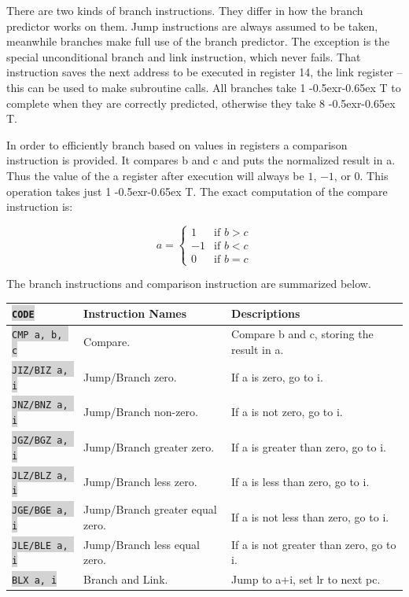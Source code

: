 \documentclass{article}
\newcommand{\vnscode}[1]{\colorbox{lightgray}{\lstinline[language=vns]{#1}}}
\newcommand{\RT}{\lower-0.5ex\hbox{r}\kern-0.65ex T}
\begin{document}
There are two kinds of branch instructions. They differ in how the branch
predictor works on them. Jump instructions are always assumed to be taken,
meanwhile branches make full use of the branch predictor. The exception is the
special unconditional branch and link instruction, which never fails. That
instruction saves the next address to be executed in register 14, the link
register -- this can be used to make subroutine calls. All branches take 1 \RT
to complete when they are correctly predicted, otherwise they take 8 \RT.

In order to efficiently branch based on values in registers a comparison
instruction is provided. It compares b and c and puts the normalized result in
a. Thus the value of the a register after execution will always be $1$, $-1$, or
$0$. This operation takes just 1 \RT. The exact computation of the compare
instruction is:

\begin{displaymath}
    a = \begin{cases}
        1 & \mbox{if } b > c \\
        -1 & \mbox{if } b < c \\
        0 & \mbox{if } b = c \end{cases}
\end{displaymath}

The branch instructions and comparison instruction are summarized below.

\begin{minipage}{\textwidth}
\label{table:branch}
\centering
\begin{tabular}{lll}
    \hline \vnscode{CODE} & Instruction Names & Descriptions \\ \hline
    \vnscode{CMP a, b, c} & Compare. & Compare b and c, storing the result in a. \\
    \vnscode{JIZ/BIZ a, i} & Jump/Branch zero. & If a is zero, go to i. \\
    \vnscode{JNZ/BNZ a, i} & Jump/Branch non-zero. & If a is not zero, go to i. \\
    \vnscode{JGZ/BGZ a, i} & Jump/Branch greater zero. & If a is greater than zero, go to i. \\
    \vnscode{JLZ/BLZ a, i} & Jump/Branch less zero. & If a is less than zero, go to i. \\
    \vnscode{JGE/BGE a, i} & Jump/Branch greater equal zero. & If a is not less than zero, go to i. \\
    \vnscode{JLE/BLE a, i} & Jump/Branch less equal zero. & If a is not greater than zero, go to i. \\
    \vnscode{BLX a, i} & Branch and Link. & Jump to a+i, set lr to next pc. \\
\end{tabular}
\end{minipage}
\end{document}
